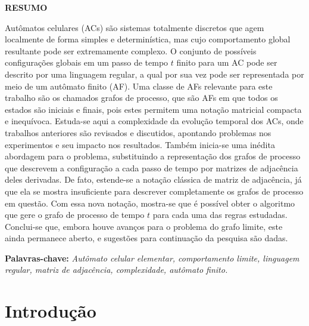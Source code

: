 \documentclass[12pt,a4paper]{article}
\begin{document}
\newpage
\thispagestyle{plain}
\begin{center}
\large  
\textbf{RESUMO}
\end{center}
\renewcommand{\baselinestretch}{0.6666666}
Autômatos celulares (ACs) são sistemas totalmente discretos que agem
localmente de forma simples e determinística, mas cujo comportamento
global resultante pode ser extremamente complexo. O conjunto de possíveis
configurações globais em um passo de tempo $t$ finito para um AC pode ser
descrito por uma linguagem regular, a qual por sua vez pode ser representada
por meio de um autômato finito (AF). Uma classe de AFs relevante para este
trabalho são os chamados grafos de processo, que são AFs em que todos os
estados são iniciais e finais, pois estes permitem uma notação matricial
compacta e inequívoca. Estuda-se aqui a complexidade da evolução temporal
dos ACs, onde trabalhos anteriores são revisados e discutidos, apontando
problemas nos experimentos e seu impacto nos resultados. Também inicia-se
uma inédita abordagem para o problema, substituindo a representação dos
grafos de processo que descrevem a configuração a cada passo de tempo
por matrizes de adjacência deles derivadas. De fato, estende-se a notação
clássica de matriz de adjacência, já que ela se mostra insuficiente para
descrever completamente os grafos de processo em questão. Com essa nova
notação, mostra-se que é possível obter o algoritmo que gere o grafo de
processo de tempo $t$ para cada uma das regras estudadas. Conclui-se que,
embora houve avanços para o problema do grafo limite, este ainda permanece
aberto, e sugestões para continuação da pesquisa são dadas.
\\[0.5cm]
\begin{flushleft}
{\bf Palavras-chave:} {\it Autômato celular elementar, comportamento limite,
linguagem regular, matriz de adjacência, complexidade, autômato finito.}
\end{flushleft}

\newpage
\thispagestyle{empty}
\tableofcontents

\newpage
\pagestyle{plain}
\renewcommand{\baselinestretch}{1.5} 
\normalsize

\newcommand{\citecustom}[1]{[\citeauthoronline{#1}, \citeyear{#1}]}

\section{Introdução}
\end{document}
